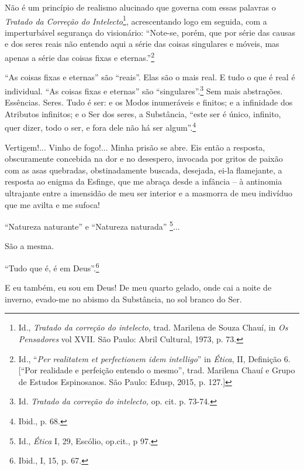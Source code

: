 Não é um princípio de realismo alucinado que governa com essas palavras
o \emph{Tratado da Correção do Intelecto}\footnote{Id., \emph{Tratado da
  correção do intelecto}, trad. Marilena de Souza Chauí, in \emph{Os
  Pensadores} vol XVII. São Paulo: Abril Cultural, 1973, p. 73.},
acrescentando logo em seguida, com a imperturbável segurança do
visionário: ``Note-se, porém, que por série das causas e dos seres reais
não entendo aqui a série das coisas singulares e móveis, mas apenas a
série das coisas fixas e eternas.''\footnote{Id., ``\emph{Per realitatem
  et perfectionem idem intelligo}'' in \emph{Ética}, II, Definição 6.
  {[}``Por realidade e perfeição entendo o mesmo'', trad. Marilena Chauí
  e Grupo de Estudos Espinosanos. São Paulo: Edusp, 2015, p. 127.{]}}

``As coisas fixas e eternas'' são ``reais''. Elas são o mais real. E
tudo o que é real é individual. ``As coisas fixas e eternas'' são
``singulares''.\footnote{Id. \emph{Tratado da correção do intelecto,}
  op. cit. p. 73-74.} Sem mais abstrações. Essências. Seres. Tudo é ser:
e os Modos inumeráveis e finitos; e a infinidade dos Atributos
infinitos; e o Ser dos seres, a Substância, ``este ser é único,
infinito, quer dizer, todo o ser, e fora dele não há ser
algum''.\footnote{Ibid., p. 68.}

Vertigem!... Vinho de fogo!... Minha prisão se abre. Eis então a
resposta, obscuramente concebida na dor e no desespero, invocada por
gritos de paixão com as asas quebradas, obstinadamente buscada,
desejada, ei-la flamejante, a resposta ao enigma da Esfinge, que me
abraça desde a infância -- à antinomia ultrajante entre a imensidão de
meu ser interior e a masmorra de meu indivíduo que me avilta e me
sufoca!

``Natureza naturante'' e ``Natureza naturada'' \footnote{Id.,
  \emph{Ética} I, 29, Escólio, op.cit., p 97.}...

São a mesma.

``Tudo que é, é em Deus''.\footnote{Ibid., I, 15, p. 67.}

E eu também, eu sou em Deus! De meu quarto gelado, onde cai a noite de
inverno, evado-me no abismo da Substância, no sol branco do Ser.

